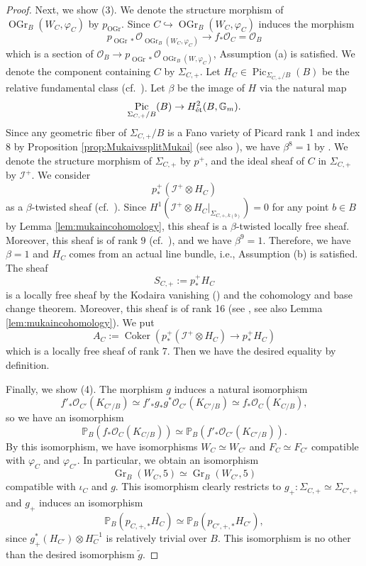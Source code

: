 \documentclass[autodetect-engine, a4paper]{amsart}
\theoremstyle{definition}
\def\G{{\mathbb G}}
\def\P{{\mathbb P}}
\def\cO{\mathcal{O}}
\DeclareMathOperator{\coker}{Coker}
\DeclareMathOperator\Pic{\mathrm{Pic}}
\DeclareMathOperator\Gr{\mathrm{Gr}}
\DeclareMathOperator\OGr{\mathrm{OGr}}
\def\et{\mathop{\text{\rm \'et}}}
\newcommand{\cred}{\color{black}}
\begin{document}
\begin{proof}
Next, we show (3).
We denote the structure morphism of $\OGr_B (W_{C}, \varphi_{C})$ by $p_{\OGr}$.
Since $C \hookrightarrow \OGr_B (W_{C}, \varphi_{C})$ induces the morphism
\[
p_{\OGr \ast} \cO_{\OGr_B (W_{C}, \varphi_{C})} \rightarrow f_{\ast} \cO_{C} = \cO_{B}
\]
which is a section of $\cO_{B} \rightarrow p_{\OGr \ast} \cO_{\OGr_B (W, \varphi_{C})}$, Assumption (a) is satisfied. 
We denote the component containing $C$ by $\Sigma_{C,+}$.
Let $H_{C} \in \Pic_{\Sigma_{C,+}/B} (B)$ be the relative fundamental class (cf.\ \cite[Corollary 2.6]{Kuznetsovfamily}).
Let $\beta$ be the image of $H$ via the natural map 
\[
\Pic_{\Sigma_{C, +}/B} (B) \rightarrow H^2_{\et} (B, \G_{m}).
\]
Since any geometric fiber of $\Sigma_{C,+}/B$ is a Fano variety of Picard rank 1 and index $8$ {\cred by Proposition \ref{prop:MukaivssplitMukai} (see also \cite[Proposition 2.1]{Mukaicurve})},
we have
$\beta^8 =1$
by \cite[Corollary 2.17]{Kuznetsovfamily}.
We denote the structure morphism of $\Sigma_{C,+}$ by $p^{+}$, and the ideal sheaf of $C$ in $\Sigma_{C,+}$ by $\mathcal{I}^{+}$.
{\cred We consider
\[
p^+_* (\mathcal{I}^{+} \otimes H_{C})
\]
as a $\beta$-twisted sheaf (cf.\ \cite[Subsection 2.2]{Kuznetsovfamily}).
Since $H^1(\mathcal{I}^{+} \otimes H_{C}|_{\Sigma_{C,+, k(b)}})=0$ for any point $b\in B$ by Lemma \ref{lem:mukaincohomology}, this sheaf is a $\beta$-twisted locally free sheaf.
Moreover, this sheaf is of rank $9$ (cf.\ \cite[Proposition 2.2]{Mukaicurve}), and we have $\beta^{9} =1$.
Therefore, we have $\beta=1$ and $H_{C}$ comes from an actual line bundle, i.e., Assumption (b) is satisfied.
The sheaf
\[
S_{C,+} := p_{\ast}^+ H_{C}
\]
is a locally free sheaf by the Kodaira vanishing (\cite[Proposition 2 and Theorem 2]{Mehta-Ramanathan}) and the cohomology and base change theorem.
Moreover, this sheaf is of rank 16 (see \cite{Mukaicurve}, see also Lemma \ref{lem:mukaincohomology}).
We put
\[
A_{C} := \coker ( p_{\ast}^+ (\mathcal{I}^{+} \otimes H_{C}) \rightarrow  p_{\ast}^+ H_{C})
\]
which is a locally free sheaf of rank $7$.
Then we have the desired equality by definition.}

Finally, we show (4).
The morphism $g$ induces a natural isomorphism
\[
f'_{\ast} \cO_{C'} ( K_{C'/B} )\simeq f'_{\ast} g_{\ast} g^{\ast} \cO_{C'}( K_{C'/B}) \simeq f_{\ast} \cO_{C}( K_{C/B}),
\]
so we have an isomorphism
\[
\P_{B} (f_{\ast} \cO_{C}( K_{C/B})) \simeq \P_{B} (f'_{\ast} \cO_{C'}( K_{C'/B})).
\]
By this isomorphism, we have isomorphisms $W_C \simeq W_{C'}$ and $F_C \simeq F_{C'}$ compatible with $\varphi_{C}$ and $\varphi_{C'}$.
In particular, we obtain an isomorphism \[ \Gr_B (W_{C}, 5) \simeq \Gr_B (W_{C'}, 5)
\]
compatible with $\iota_{C}$ and $g$.
This isomorphism clearly restricts to $g_{+} \colon \Sigma_{C,+} \simeq \Sigma_{C',+}$ and $g_+$ induces an isomorphism
\[
\P_{B} (p_{C, +,\ast} H_{C}) \simeq \P_{B}( p_{C', +, \ast} H_{C'}),
\]
since $g_{+}^{\ast} (H_{C'}) \otimes H_{C}^{-1}$ is relatively trivial over $B$. 
This isomorphism is no other than the desired isomorphism $\widetilde{g}$.
\end{proof}
\end{document}
